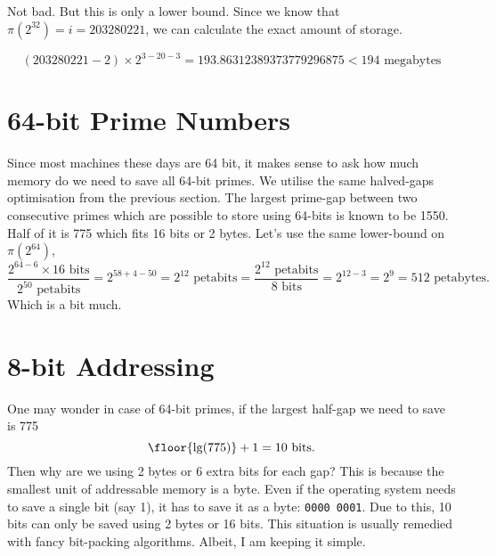 \documentclass{homework}
\begin{document}
Not bad. But this is only a lower bound. Since we know that $\pi(2^{32})=i=203280221$, we can calculate the exact amount of storage.

\[
    (203280221-2) \times 2^{3-20-3} = 193.86312389373779296875 < 194\text{ megabytes}
\]

\section{64-bit Prime Numbers}

Since most machines these days are 64 bit, it makes sense to ask how much memory do we need to save all 64-bit primes. We utilise the same halved-gaps optimisation from the previous section. The largest prime-gap between two consecutive primes which are possible to store using 64-bits is known to be 1550. Half of it is 775 which fits 16 bits or 2 bytes. Let's use the same lower-bound on $\pi(2^{64})$,
\[
    \frac{2^{64-6}\times 16\text{ bits}}{2^{50} \text{ petabits}} =
    2^{58+4-50} = 2^{12} \text{ petabits} = \frac{2^{12} \text{ petabits}}{8 \text{ bits}} = 2^{12-3}=2^{9} = 512 \text{ petabytes}.
\]
Which is a bit much.

\section{8-bit Addressing}

One may wonder in case of 64-bit primes, if the largest half-gap we need to save is 775 \ie
\[
    \floor{\lg(775)}+1=10\text{ bits.}
\]
Then why are we using 2 bytes or 6 extra bits for each gap? This is because the smallest unit of addressable memory is a byte. Even if the operating system needs to save a single bit (say 1), it has to save it as a byte: \texttt{0000 0001}. Due to this, 10 bits can only be saved using 2 bytes or 16 bits. This situation is usually remedied with fancy bit-packing algorithms. Albeit, I am keeping it simple.
\end{document}
